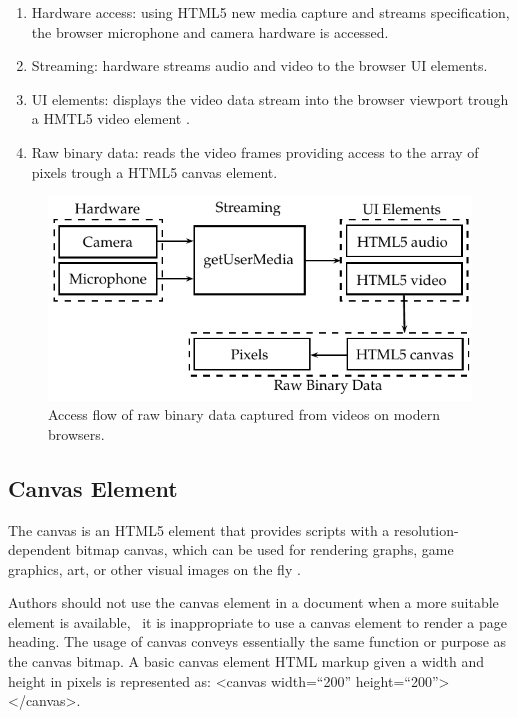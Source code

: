 \begin{enumerate}
  \item  Hardware access: using HTML5 new media capture and streams specification, the browser microphone and camera hardware is accessed.
  \item Streaming: hardware streams audio and video to the browser UI elements.
  \item UI elements: displays the video data stream into the browser viewport trough a HMTL5 video element \cite{WC2006}.
  \item Raw binary data: reads the video frames providing access to the array of pixels trough a HTML5 canvas element.
\end{enumerate}

\begin{figure}[!htb]
  \centering
  \includegraphics{chapters/basic_concepts/get_user_media.pdf}
  \caption{Access flow of raw binary data captured from videos on modern browsers.}
  \label{figure:get_user_media}
\end{figure}


\subsection{Canvas Element} %
\label{sub:basic_concepts:web:canvas_element}

The canvas is an HTML5 element that provides scripts with a resolution-dependent bitmap canvas, which can be used for rendering graphs, game graphics, art, or other visual images on the fly \cite{Canvas2013}.

Authors should not use the canvas element in a document when a more suitable element is available, \eg\ it is inappropriate to use a canvas element to render a page heading. The usage of canvas conveys essentially the same function or purpose as the canvas bitmap. A basic canvas element HTML markup given a width and height in pixels is represented as: <canvas width=``200'' height=``200''></canvas>.

